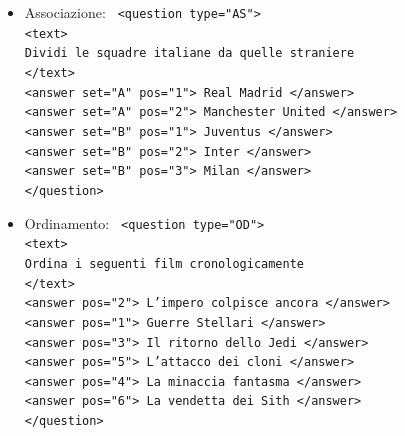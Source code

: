 \documentclass[a4paper,11pt]{article}
\newcommand{\code}[1]{\texttt{#1}}
\begin{document}
\begin{itemize}
\item Associazione:
\code{
<question type="AS">\\ 
	<text>\\
    	Dividi le squadre italiane da quelle straniere\\
    </text>\\
    <answer set="A" pos="1"> Real Madrid </answer>\\
    <answer set="A" pos="2"> Manchester United </answer>\\
    <answer set="B" pos="1"> Juventus </answer>\\
    <answer set="B" pos="2"> Inter </answer>\\
    <answer set="B" pos="3"> Milan </answer>\\
</question>\\
}
\item Ordinamento:
\code{
<question type="OD">\\
	<text>\\
    	Ordina i seguenti film cronologicamente\\
    </text>\\
	<answer pos="2"> L'impero colpisce ancora </answer>\\ 
    <answer pos="1"> Guerre Stellari </answer>\\
    <answer pos="3"> Il ritorno dello Jedi </answer>\\
    <answer pos="5"> L'attacco dei cloni </answer>\\
    <answer pos="4"> La minaccia fantasma </answer>\\
    <answer pos="6"> La vendetta dei Sith </answer>\\
</question>
}
\end{itemize}
\end{document}

